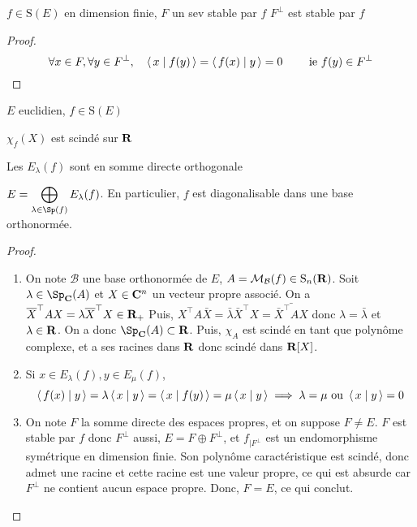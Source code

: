 \begin{prop}
    \Hyp $f \in  \mathrm S(E)$ en dimension finie, $F$ un sev stable par  $f$
    \Conc  $F^\perp$ est stable par  $f$
\end{prop}

\begin{proof}
     \[
         \forall  x \in  F, \forall  y \in  F^\perp, \quad  \scalar{x}{f(y)} =\scalar{f(x)}{y} =0 \qquad  \text{ ie } f(y) \in  F^\perp
    \] 
\end{proof}

\begin{thm}
    \Hyp $E$ euclidien,  $f \in  \mathrm  S(E)$
    \begin{concenum}
    \item $\chi_f(X)$ est scindé sur  $ \mathbf R$
    \item Les $E_{\lambda}(f)$ sont en somme directe orthogonale
    \item $\displaystyle E=\bigoplus_{\lambda \in  \Sp(f)}E_{\lambda}(f)$. En particulier, $f$ est diagonalisable dans une base orthonormée.
    \end{concenum}
\end{thm}
\begin{proof}~
\begin{enumerate}
    \item On note $\mathcal  B$ une base orthonormée de $E$,  $A=\mathcal  M_{\mathcal  B}(f) \in  \mathrm S_n(\mathbf R)$. Soit $ \lambda \in  \Sp_{\C}(A)$ et $X \in \mathbf C^n$ un vecteur propre associé. On a $\overline{X}^\top AX=\lambda \overline{X}^\top X\in \mathbf R_+$ Puis, $X^\top A \bar{X}=\bar{\lambda} \bar{X}^\top X = \bar{\bar{X}^\top AX}$ donc $ \lambda=\bar\lambda$ et $\lambda \in  \mathbf R$. On a donc $\Sp_{\C}(A)\subset \R$. Puis, $\chi_A$ est scindé en tant que polynôme complexe, et a ses racines dans $\mathbf R$ donc scindé dans $\mathbf R[X]$.
    \item Si $x \in  E_{\lambda}(f), y \in  E_{\mu}(f)$, \[
            \scalar{f(x)}{y} =\lambda \scalar{x}{y} = \scalar{x}{f(y)} = \mu \scalar{x}{y} \implies \lambda=\mu \text{ ou } \scalar{x}{y} =0
    \] 
\item On note $F$ la somme directe des espaces propres, et on suppose  $F\neq E$.  $F$ est stable par  $f$ donc  $F^\perp$ aussi,  $E=F\oplus F^\perp$, et  $f_{|F^\perp}$ est un endomorphisme symétrique en dimension finie. Son polynôme caractéristique est scindé, donc admet une racine et cette racine est une valeur propre, ce qui est absurde car $F^\perp$ ne contient aucun espace propre. Donc,  $F=E$, ce qui conclut.
\end{enumerate}
\end{proof}

